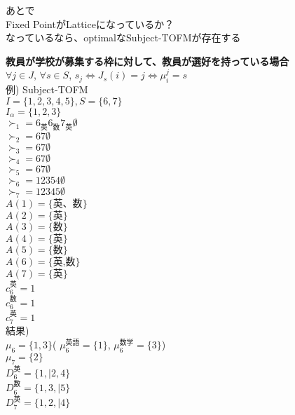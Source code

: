 \documentclass[a4j,10pt]{jsarticle}
\theoremstyle{definition}
\theoremstyle{remark}
\theoremstyle{plain}
\begin{document}
\begin{tcolorbox}[enhanced,breakable=true]
  あとで\\
  Fixed PointがLatticeになっているか？\\
  なっているなら、optimalなSubject-TOFMが存在する\\
\end{tcolorbox}
\begin{tcolorbox}[enhanced,breakable=true]
\textbf{教員が学校が募集する枠に対して、教員が選好を持っている場合}\\
$\forall j \in J$, $\forall s \in S$, $s_j \Leftrightarrow  J_s(i) = j \Leftrightarrow \mu_i^j = s$\\
例) Subject-TOFM\\
$I = \{1,2,3,4,5\}, S = \{6,7\}$\\
$I_\alpha = \{1,2,3\}$\\
$\succ_1 = 6_{\text{英}}6_{\text{数}}7_{\text{英}}\emptyset$\\
$\succ_2 = 67\emptyset$\\
$\succ_3 = 67\emptyset$\\
$\succ_4 = 67\emptyset$\\
$\succ_5 = 67\emptyset$\\
$\succ_6 = 12354\emptyset$\\
$\succ_7 = 12345\emptyset$\\

$A(1) = \{\text{英、数}\}$\\
$A(2) = \{\text{英}\}$\\
$A(3) = \{\text{数}\}$\\
$A(4) = \{\text{英}\}$\\
$A(5) = \{\text{数}\}$\\
$A(6) = \{\text{英,数}\}$\\
$A(7) = \{\text{英}\}$\\
$c_6^{\text{英}} = 1$\\
$c_6^{\text{数}} = 1$\\
$c_7^{\text{英}} = 1$\\

結果)\\
$\mu_6 = \{1,3\}$( $\mu_6^{\text{英語}} = \{1\}$, $\mu_6^{\text{数学}} = \{3\}$)\\
$\mu_7 = \{2\}$\\

$D_6^{\text{英}} = \{1,|2,4\}$\\
$D_6^{\text{数}} = \{1,3,|5\}$\\
$D_7^{\text{英}} = \{1,2,|4\}$\\



\end{tcolorbox}
\end{document}

